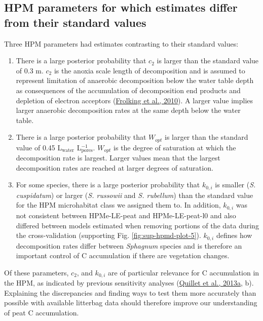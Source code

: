 \documentclass[
  12pt,
]{article}
\begin{document}
\hypertarget{out-discussion-1}{%
\subsection{HPM parameters for which estimates differ from their standard values}\label{out-discussion-1}}

Three HPM parameters had estimates contrasting to their standard values:

\begin{enumerate}
\def\labelenumi{\arabic{enumi}.}
\item
  There is a large posterior probability that \(c_2\) is larger than the standard value of 0.3 m. \(c_2\) is the anoxia scale length of decomposition and is assumed to represent limitation of anaerobic decomposition below the water table depth as consequences of the accumulation of decomposition end products and depletion of electron acceptors (\protect\hyperlink{ref-Frolking.2010}{Frolking et al., 2010}). A larger value implies larger anaerobic decomposition rates at the same depth below the water table.
\item
  There is a large posterior probability that \(W_{opt}\) is larger than the standard value of 0.45 L\(_\text{water}\) L\(_\text{pores}^{-1}\). \(W_{opt}\) is the degree of saturation at which the decomposition rate is largest. Larger values mean that the largest decomposition rates are reached at larger degrees of saturation.
\item
  For some species, there is a large posterior probability that \(k_{0,i}\) is smaller (\emph{S. cuspidatum}) or larger (\emph{S. russowii} and \emph{S. rubellum}) than the standard value for the HPM microhabitat class we assigned them to. In addition, \(k_{0,i}\) was not consistent between HPMe-LE-peat and HPMe-LE-peat-l0 and also differed between models estimated when removing portions of the data during the cross-validation (supporting Fig. \ref{fig:sup-hpmd-plot-5}). \(k_{0,i}\) defines how decomposition rates differ between \emph{Sphagnum} species and is therefore an important control of C accumulation if there are vegetation changes.
\end{enumerate}

Of these parameters, \(c_2\), and \(k_{0,i}\) are of particular relevance for C accumulation in the HPM, as indicated by previous sensitivity analyses (\protect\hyperlink{ref-Quillet.2013}{Quillet et al., 2013a}, b). Explaining the discrepancies and finding ways to test them more accurately than possible with available litterbag data should therefore improve our understanding of peat C accumulation.
\end{document}
